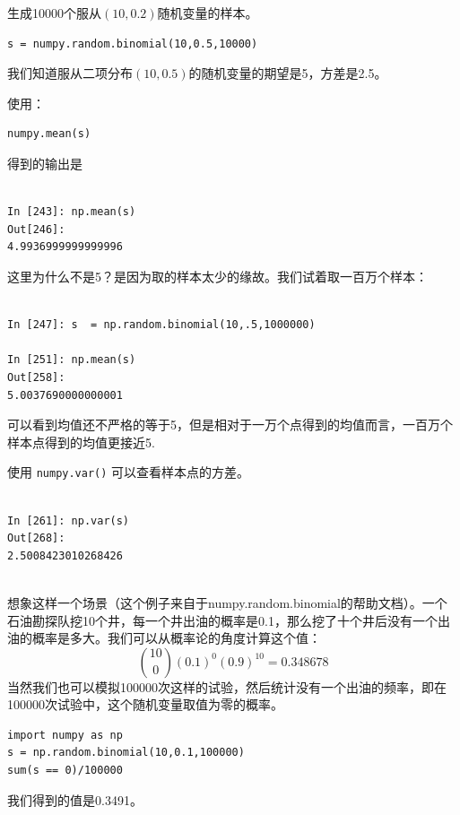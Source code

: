 \documentclass[10pt,a4paper,UTF8]{article}
\begin{document}
生成10000个服从\((10,0.2)\)随机变量的样本。
\lstset{language=Python,label= ,caption= ,captionpos=b,numbers=none}
\begin{lstlisting}
s = numpy.random.binomial(10,0.5,10000)
\end{lstlisting}
我们知道服从二项分布\((10,0.5)\)的随机变量的期望是5，方差是2.5。

使用：
\lstset{language=Python,label= ,caption= ,captionpos=b,numbers=none}
\begin{lstlisting}
numpy.mean(s)
\end{lstlisting}
得到的输出是
\begin{verbatim}

In [243]: np.mean(s)
Out[246]:
4.9936999999999996

\end{verbatim}

这里为什么不是5？是因为取的样本太少的缘故。我们试着取一百万个样本：
\begin{verbatim}

In [247]: s  = np.random.binomial(10,.5,1000000)

In [251]: np.mean(s)
Out[258]:
5.0037690000000001

\end{verbatim}
可以看到均值还不严格的等于5，但是相对于一万个点得到的均值而言，一百万个样本点得到的均值更接近5.

使用 \texttt{numpy.var()} 可以查看样本点的方差。
\begin{verbatim}

In [261]: np.var(s)
Out[268]:
2.5008423010268426


\end{verbatim}

想象这样一个场景（这个例子来自于numpy.random.binomial的帮助文档）。一个石油勘探队挖10个井，每一个井出油的概率是0.1，那么挖了十个井后没有一个出油的概率是多大。我们可以从概率论的角度计算这个值：
\begin{equation}
\label{eq:13}
\binom{10}{0}(0.1)^{0}(0.9)^{10} = 0.348678
\end{equation}
当然我们也可以模拟100000次这样的试验，然后统计没有一个出油的频率，即在100000次试验中，这个随机变量取值为零的概率。
\lstset{language=Python,label= ,caption= ,captionpos=b,numbers=none}
\begin{lstlisting}
import numpy as np
s = np.random.binomial(10,0.1,100000)
sum(s == 0)/100000
\end{lstlisting}
我们得到的值是0.3491。
\end{document}
